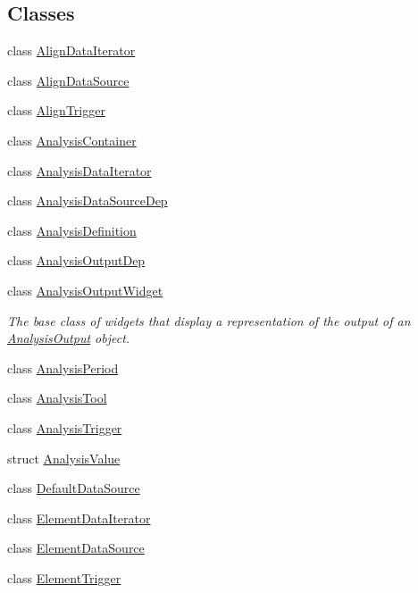 \subsection*{Classes}
\begin{DoxyCompactItemize}
\item 
class \hyperlink{class_picto_1_1_align_data_iterator}{Align\-Data\-Iterator}
\item 
class \hyperlink{class_picto_1_1_align_data_source}{Align\-Data\-Source}
\item 
class \hyperlink{class_picto_1_1_align_trigger}{Align\-Trigger}
\item 
class \hyperlink{class_picto_1_1_analysis_container}{Analysis\-Container}
\item 
class \hyperlink{class_picto_1_1_analysis_data_iterator}{Analysis\-Data\-Iterator}
\item 
class \hyperlink{class_picto_1_1_analysis_data_source_dep}{Analysis\-Data\-Source\-Dep}
\item 
class \hyperlink{class_picto_1_1_analysis_definition}{Analysis\-Definition}
\item 
class \hyperlink{class_picto_1_1_analysis_output_dep}{Analysis\-Output\-Dep}
\item 
class \hyperlink{class_picto_1_1_analysis_output_widget}{Analysis\-Output\-Widget}
\begin{DoxyCompactList}\small\item\em The base class of widgets that display a representation of the output of an \hyperlink{class_picto_1_1_analysis_output}{Analysis\-Output} object. \end{DoxyCompactList}\item 
class \hyperlink{class_picto_1_1_analysis_period}{Analysis\-Period}
\item 
class \hyperlink{class_picto_1_1_analysis_tool}{Analysis\-Tool}
\item 
class \hyperlink{class_picto_1_1_analysis_trigger}{Analysis\-Trigger}
\item 
struct \hyperlink{struct_picto_1_1_analysis_value}{Analysis\-Value}
\item 
class \hyperlink{class_picto_1_1_default_data_source}{Default\-Data\-Source}
\item 
class \hyperlink{class_picto_1_1_element_data_iterator}{Element\-Data\-Iterator}
\item 
class \hyperlink{class_picto_1_1_element_data_source}{Element\-Data\-Source}
\item 
class \hyperlink{class_picto_1_1_element_trigger}{Element\-Trigger}

\end{DoxyCompactItemize}
